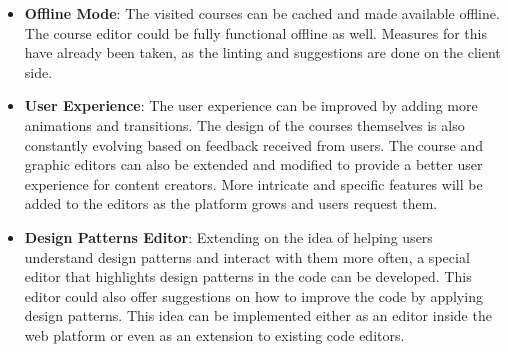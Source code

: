 \begin{itemize}
\item \textbf{Offline Mode}: The visited courses can be cached and made available offline. The course editor could be fully functional offline as well. Measures for this have already been taken, as the linting and suggestions are done on the client side.

\item \textbf{User Experience}: The user experience can be improved by adding more animations and transitions. The design of the courses themselves is also constantly evolving based on feedback received from users. The course and graphic editors can also be extended and modified to provide a better user experience for content creators. More intricate and specific features will be added to the editors as the platform grows and users request them.

\item \textbf{Design Patterns Editor}: Extending on the idea of helping users understand design patterns and interact with them more often, a special editor that highlights design patterns in the code can be developed. This editor could also offer suggestions on how to improve the code by applying design patterns. This idea can be implemented either as an editor inside the web platform or even as an extension to existing code editors.
\end{itemize}

